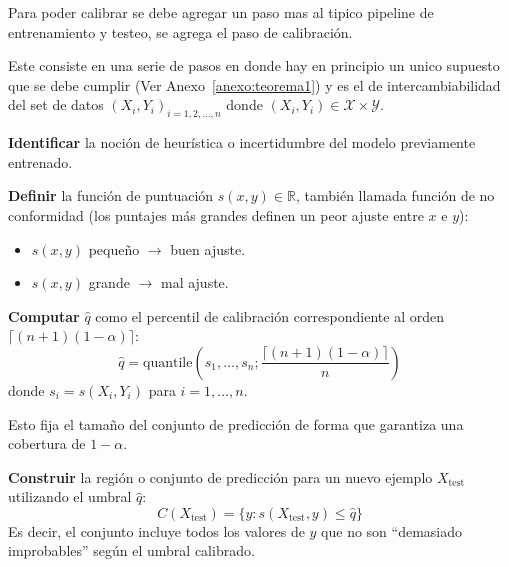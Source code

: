 Para poder calibrar se debe agregar un paso mas al tipico pipeline de entrenamiento y testeo, se agrega el paso de calibración.

Este consiste en una serie de pasos en donde hay en principio un unico supuesto que se debe cumplir  (Ver Anexo~\ref{anexo:teorema1}) y es el de intercambiabilidad del set de datos $(X_i, Y_i)_{i=1,2,\dots , n}$ donde $(X_i, Y_i) \in \mathcal{X} \times \mathcal{Y}$.


\begin{algorithm}[H]
\caption{Proceso de Calibración en \textit{Conformal Prediction - Framework}}
\label{alg:conformal_prediction}
\begin{algorithmic}[1] %
    \STATE \textbf{Identificar} la noción de heurística o incertidumbre del modelo previamente entrenado.

    \STATE \textbf{Definir} la función de puntuación $s(x,y) \in \mathbb{R}$, también llamada función de no conformidad (los puntajes más grandes definen un peor ajuste entre $x$ e $y$):
    \begin{itemize}
        \item $s(x,y)$ pequeño $\rightarrow$ buen ajuste.
        \item $s(x,y)$ grande $\rightarrow$ mal ajuste.
    \end{itemize}

    \STATE \textbf{Computar} $\hat{q}$ como el percentil de calibración correspondiente al orden $\lceil(n+1)(1-\alpha)\rceil$:
    \begin{equation*}
        \hat{q} = \text{quantile}\left(s_1, \dots, s_n; \frac{\lceil(n+1)(1-\alpha)\rceil}{n}\right)
    \end{equation*}
    donde $s_i = s(X_i, Y_i)$ para $i=1, \dots, n$.

    Esto fija el tamaño del conjunto de predicción de forma que garantiza una cobertura de $1-\alpha$.

    \STATE \textbf{Construir} la región o conjunto de predicción para un nuevo ejemplo $X_{\text{test}}$ utilizando el umbral $\hat{q}$:
    \begin{equation*}
        C(X_{\text{test}}) = \{ y : s(X_{\text{test}}, y) \le \hat{q} \}
    \end{equation*}
    Es decir, el conjunto incluye todos los valores de $y$ que no son ``demasiado improbables'' según el umbral calibrado.
\end{algorithmic}
\end{algorithm}

